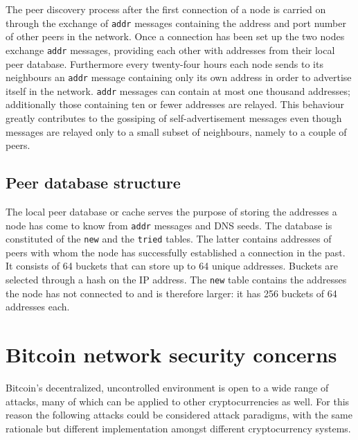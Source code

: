 \documentclass[12pt, letterpaper, twoside]{article}
\begin{document}
The peer discovery process after the first connection of a node is carried on through the exchange of \texttt{addr} messages containing the address and port number of other peers in the network. Once a connection has been set up the two nodes exchange \texttt{addr} messages, providing each other with addresses from their local peer database. Furthermore every twenty-four hours each node sends to its neighbours an \texttt{addr} message containing only its own address in order to advertise itself in the network. \texttt{addr} messages can contain at most one thousand addresses; additionally those containing ten or fewer addresses are relayed. This behaviour greatly contributes to the gossiping of self-advertisement messages even though messages are relayed only to a small subset of neighbours, namely to a couple of peers.

\subsection{Peer database structure}\label{cachestruct}
The local peer database or cache serves the purpose of storing the addresses a node has come to know from \texttt{addr} messages and DNS seeds. The database is constituted of the \texttt{new} and the \texttt{tried} tables. The latter contains addresses of peers with whom the node has successfully established a connection in the past. It consists of 64 buckets that can store up to 64 unique addresses. Buckets are selected through a hash on the IP address. The \texttt{new} table contains the addresses the node has not connected to and is therefore larger: it has 256 buckets of 64 addresses each.

\section{Bitcoin network security concerns}\label{securityintro}
Bitcoin's decentralized, uncontrolled environment is open to a wide range of attacks, many of which can be applied to other cryptocurrencies as well. For this reason the following attacks could be considered attack paradigms, with the same rationale but different implementation amongst different cryptocurrency systems.
\end{document}
